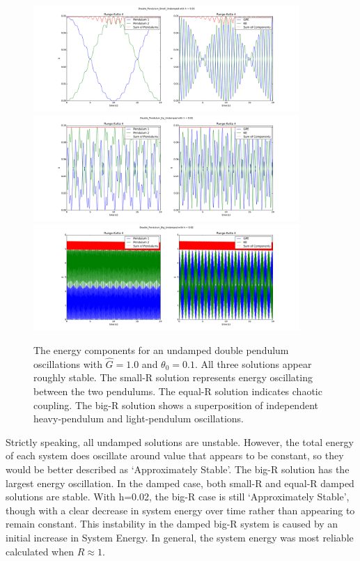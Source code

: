 \documentclass{article}
\begin{document}
\begin{figure}
\begin{center}
\includegraphics[width=0.9\textwidth]{Double_Pendulum_Small_Undamped_Energy_Components}
\includegraphics[width=0.9\textwidth]{Double_Pendulum_Eq_Undamped_Energy_Components}
\includegraphics[width=0.9\textwidth]{Double_Pendulum_Big_Undamped_Energy_Components}
\caption{The energy components for an undamped double pendulum oscillations with $\hat{G}=1.0$ and $\theta_{0} = 0.1$. All three solutions appear roughly stable. The small-R solution represents energy oscillating between the two pendulums. The equal-R solution indicates chaotic coupling. The big-R solution shows a superposition of independent heavy-pendulum and light-pendulum oscillations.}
\label{fig:doubleundampedenergy}
\end{center}
\end{figure}

Strictly speaking, all undamped solutions are unstable. However, the total energy of each system does oscillate around value that appears to be constant, so they would be better described as \textquoteleft Approximately Stable'. The big-R solution has the largest energy oscillation. In the damped case, both small-R and equal-R damped solutions are stable. With h=0.02, the big-R case is still \textquoteleft Approximately Stable', though with a clear decrease in system energy over time rather than appearing to remain constant. This instability in the damped big-R system is caused by an initial increase in System Energy. In general, the system energy was most reliable calculated when $R\approx 1$.
\end{document}
